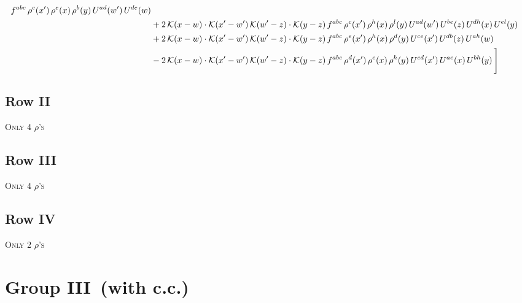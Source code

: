 \documentclass[9pt]{article}
\numberwithin{equation}{section}
\begin{document}
\begin{align}
f^{abc}\,\rho^{c}(x')\,\rho^{e}(x)\,\rho^{b}(y)\,U^{ad}(w')\,U^{de}(w)\notag \\ & +2\, \mathcal{K}(x-w)\cdot \mathcal{K}(x'-w')\, \mathcal{K}(w'-z)\cdot \mathcal{K}(y-z)\, f^{abc}\,\rho^{c}(x')\,\rho^{h}(x)\,\rho^{l}(y)\,U^{ad}(w')\,U^{be}(z)\,U^{dh}(x)\,U^{el}(y)\notag \\ & +2\, \mathcal{K}(x-w)\cdot \mathcal{K}(x'-w')\, \mathcal{K}(w'-z)\cdot \mathcal{K}(y-z)\, f^{abc}\,\rho^{e}(x')\,\rho^{h}(x)\,\rho^{d}(y)\,U^{ce}(x')\,U^{db}(z)\,U^{ah}(w)\notag \\ &  -2\, \mathcal{K}(x-w)\cdot \mathcal{K}(x'-w')\, \mathcal{K}(w'-z)\cdot \mathcal{K}(y-z)\, f^{abc}\,\rho^{d}(x')\,\rho^{e}(x)\,\rho^{h}(y)\,U^{cd}(x')\,U^{ae}(x)\,U^{bh}(y)\,\Bigg]
\end{align}
\subsection{Row II}
\textsc{Only 4 $\rho$'s}
\subsection{Row III}
\textsc{Only 4 $\rho$'s}
\subsection{Row IV}
\textsc{Only 2 $\rho$'s}
\section{Group III\, (with c.c.)}
\end{document}
